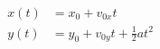 \documentclass[border=0.5cm,preview]{standalone}
\begin{document}
  
\begin{align*}
x(t) &= x_0 + v_{0x}t \\
y(t) &= y_0 + v_{0y}t + \frac{1}{2}at^2
\end{align*}
\end{document}
